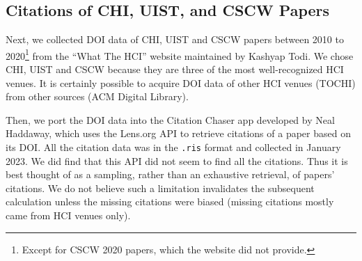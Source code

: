 \subsection{Citations of CHI, UIST, and CSCW Papers}
% 
Next, we collected DOI data of CHI, UIST and CSCW papers between 2010 to 2020\footnote{Except for CSCW 2020 papers, which the website did not provide.} from the ``What The HCI'' \cite{WhatTheH50:online} website maintained by Kashyap Todi.
We chose CHI, UIST and CSCW because they are three of the most well-recognized HCI venues.
It is certainly possible to acquire DOI data of other HCI venues (\eg TOCHI) from other sources (\eg ACM Digital Library).


Then, we port the DOI data into the Citation Chaser app \cite{citation47:online} developed by Neal Haddaway, which uses the Lens.org API \cite{TheLensF23:online} to retrieve citations of a paper based on its DOI.
All the citation data was in the \texttt{.ris} format and collected in January 2023.
We did find that this API did not seem to find all the citations. 
Thus it is best thought of as a sampling, rather than an exhaustive retrieval, of papers' citations. 
We do not believe such a limitation invalidates the subsequent \xin calculation unless the missing citations were biased (\eg missing citations mostly came from HCI venues only).

